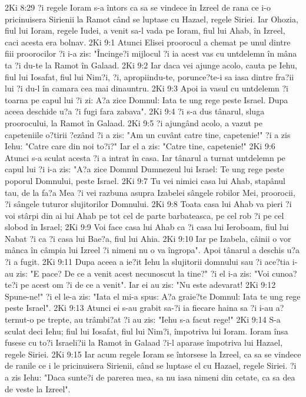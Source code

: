 2Ki 8:29  ?i regele Ioram s-a întors ca sa se vindece în Izreel de rana ce i-o pricinuisera Sirienii la Ramot când se luptase cu Hazael, regele Siriei. Iar Ohozia, fiul lui Ioram, regele Iudei, a venit sa-l vada pe Ioram, fiul lui Ahab, în Izreel, caci acesta era bolnav.
2Ki 9:1  Atunci Elisei proorocul a chemat pe unul dintre fiii proorocilor ?i i-a zis: "Încinge?i mijlocul ?i ia acest vas cu untdelemn în mâna ta ?i du-te la Ramot în Galaad.
2Ki 9:2  Iar daca vei ajunge acolo, cauta pe Iehu, fiul lui Iosafat, fiul lui Nim?i, ?i, apropiindu-te, porunce?te-i sa iasa dintre fra?ii lui ?i du-l în camara cea mai dinauntru.
2Ki 9:3  Apoi ia vasul cu untdelemn ?i toarna pe capul lui ?i zi: A?a zice Domnul: Iata te ung rege peste Israel. Dupa aceea deschide u?a ?i fugi fara zabava".
2Ki 9:4  ?i s-a dus tânarul, sluga proorocului, la Ramot în Galaad.
2Ki 9:5  ?i ajungând acolo, a vazut pe capeteniile o?tirii ?ezând ?i a zis: "Am un cuvânt catre tine, capetenie!" ?i a zis Iehu: "Catre care din noi to?i?" Iar el a zis: "Catre tine, capetenie!"
2Ki 9:6  Atunci s-a sculat acesta ?i a intrat în casa. Iar tânarul a turnat untdelemn pe capul lui ?i i-a zis: "A?a zice Domnul Dumnezeul lui Israel: Te ung rege peste poporul Domnului, peste Israel.
2Ki 9:7  Tu vei nimici casa lui Ahab, stapânul tau, de la fa?a Mea ?i vei razbuna asupra Izabelei sângele robilor Mei, proorocii, ?i sângele tuturor slujitorilor Domnului.
2Ki 9:8  Toata casa lui Ahab va pieri ?i voi stârpi din ai lui Ahab pe tot cel de parte barbateasca, pe cel rob ?i pe cel slobod în Israel;
2Ki 9:9  Voi face casa lui Ahab ca ?i casa lui Ieroboam, fiul lui Nabat ?i ca ?i casa lui Bae?a, fiul lui Ahia.
2Ki 9:10  Iar pe Izabela, câinii o vor mânca în câmpia lui Izreel ?i nimeni nu o va îngropa". Apoi tânarul a deschis u?a ?i a fugit.
2Ki 9:11  Dupa aceea a ie?it Iehu la slujitorii domnului sau ?i ace?tia i-au zis: "E pace? De ce a venit acest necunoscut la tine?" ?i el i-a zis: "Voi cunoa?te?i pe acest om ?i de ce a venit". Iar ei au zis: "Nu este adevarat!
2Ki 9:12  Spune-ne!" ?i el le-a zis: "Iata el mi-a spus: A?a graie?te Domnul: Iata te ung rege peste Israel".
2Ki 9:13  Atunci ei s-au grabit sa-?i ia fiecare haina sa ?i i-au a?ternut-o pe trepte, au trâmbi?at ?i au zis: "Iehu s-a facut rege!"
2Ki 9:14  S-a sculat deci Iehu; fiul lui Iosafat, fiul lui Nim?i, împotriva lui Ioram. Ioram însa fusese cu to?i Israeli?ii la Ramot în Galaad ?i-l aparase împotriva lui Hazael, regele Siriei.
2Ki 9:15  Iar acum regele Ioram se întorsese la Izreel, ca sa se vindece de ranile ce i le pricinuisera Sirienii, când se luptase el cu Hazael, regele Siriei. ?i a zis Iehu: "Daca sunte?i de parerea mea, sa nu iasa nimeni din cetate, ca sa dea de veste la Izreel".
